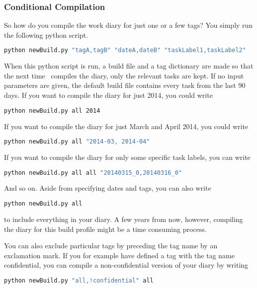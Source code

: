 \subsubsection*{Conditional Compilation}
So how do you compile the work diary for just one or a few tags? You simply run the following python script.
\begin{lstlisting}[language=bash]
python newBuild.py "tagA,tagB" "dateA,dateB" "taskLabel1,taskLabel2"
\end{lstlisting}
When this python script is run, a build file and a tag dictionary are made so that the next time \LaTeXe\ compiles the diary, only the relevant tasks are kept. If no input parameters are given, the default build file contains every task from the last 90 days. If you want to compile the diary for just 2014, you could write
\begin{lstlisting}[language=bash]
python newBuild.py all 2014
\end{lstlisting}
If you want to compile the diary for just March and April 2014, you could write
\begin{lstlisting}[language=bash]
python newBuild.py all "2014-03, 2014-04"
\end{lstlisting}
If you want to compile the diary for only some specific task labels, you can write
\begin{lstlisting}[language=bash]
python newBuild.py all all "20140315_0,20140316_0"
\end{lstlisting}
And so on. Aside from specifying dates and tags, you can also write
\begin{lstlisting}[language=bash]
python newBuild.py all
\end{lstlisting}
to include everything in your diary. A few years from now, however, compiling the diary for this build profile might be a time consuming process.

You can also exclude particular tags by preceding the tag name by an exclamation mark. If you for example have defined a tag with the tag name confidential, you can compile a non-confidential version of your diary by writing
\begin{lstlisting}[language=bash]
python newBuild.py "all,!confidential" all
\end{lstlisting}

